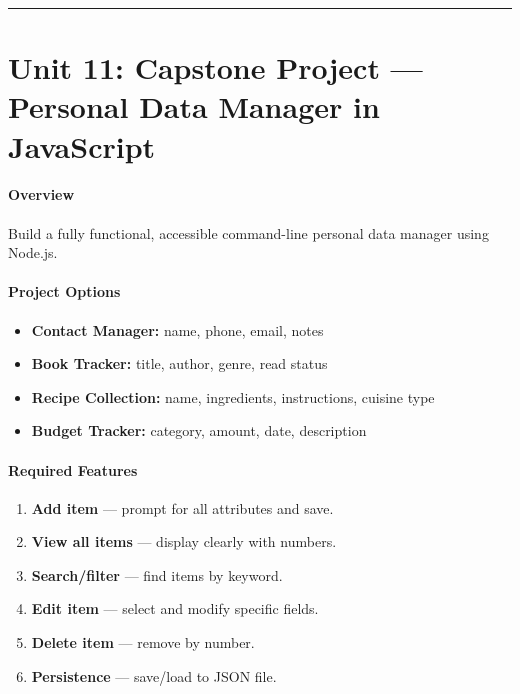 \documentclass[
  justified,
  openright,
]{tufte-book}
\let\subsection\paragraph
\let\paragraph\paragraph
\let\subsection\paragraph
\let\paragraph\paragraph
\providecommand{\tightlist}{%
  \setlength{\itemsep}{0pt}\setlength{\parskip}{0pt}}
\begin{document}
\begin{center}\rule{0.5\linewidth}{0.5pt}\end{center}

\section{Unit 11: Capstone Project --- Personal Data Manager in
JavaScript}\label{unit-11-capstone-project-personal-data-manager-in-javascript}

\subsection{Overview}\label{overview-13}

Build a fully functional, accessible command-line personal data manager
using Node.js.

\subsection{Project Options}\label{project-options}

\begin{itemize}
\tightlist
\item
  \textbf{Contact Manager:} name, phone, email, notes
\item
  \textbf{Book Tracker:} title, author, genre, read status
\item
  \textbf{Recipe Collection:} name, ingredients, instructions, cuisine
  type
\item
  \textbf{Budget Tracker:} category, amount, date, description
\end{itemize}

\subsection{Required Features}\label{required-features}

\begin{enumerate}
\def\labelenumi{\arabic{enumi}.}
\tightlist
\item
  \textbf{Add item} --- prompt for all attributes and save.
\item
  \textbf{View all items} --- display clearly with numbers.
\item
  \textbf{Search/filter} --- find items by keyword.
\item
  \textbf{Edit item} --- select and modify specific fields.
\item
  \textbf{Delete item} --- remove by number.
\item
  \textbf{Persistence} --- save/load to JSON file.
\end{enumerate}
\end{document}
